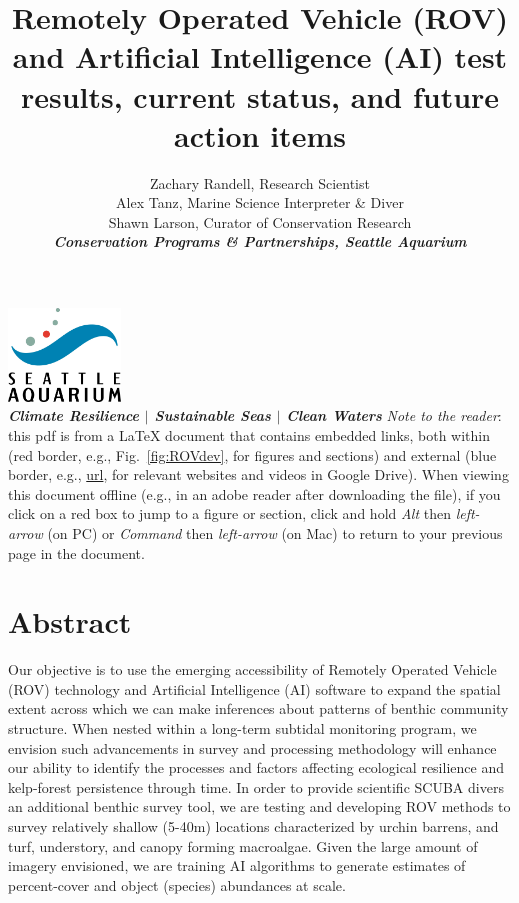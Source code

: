 \documentclass[11pt]{article}
\title{
Remotely Operated Vehicle (ROV) and Artificial Intelligence (AI) test 
results, current status, and future action items
}
\author{
Zachary Randell, Research Scientist
\\
Alex Tanz, Marine Science Interpreter \& Diver 
\\
Shawn Larson, Curator of Conservation Research
\\
\vspace{5pt}
\textit{\textbf{Conservation Programs \& Partnerships, Seattle 
Aquarium}}
}
\begin{document}
\begin{titlepage}
\maketitle
\tableofcontents
\vfill
\centering
\includegraphics[width=3cm]{logo.jpg}
\\
\textit{\textbf{
Climate Resilience $\vert$ 
Sustainable Seas $\vert$ 
Clean Waters
}} 
\vfill
\justifying
\noindent\textit{Note to the reader}: this pdf is from a LaTeX 
document that contains embedded links, both 
within (red border, e.g., Fig.~\ref{fig:ROVdev}, for figures and 
sections) and 
external (blue border, e.g.,  
\href{https://www.latex-project.org/about/}{url}, 
for relevant websites and videos in Google Drive). 
When viewing this document offline (e.g., in an adobe reader after 
downloading the file), if you click on a red box to jump to a figure or 
section, click and hold \textit{Alt} then \textit{left-arrow} (on PC) 
or \textit{Command} then \textit{left-arrow} (on Mac) to return to your 
previous page in the document.
\end{titlepage}





\section{Abstract}
\label{Abstract}
Our objective is to use the emerging accessibility of Remotely Operated 
Vehicle (ROV) technology and Artificial Intelligence (AI) software to 
expand the spatial extent across which we can make inferences about 
patterns of benthic community structure. 
When nested within a long-term subtidal monitoring program, we envision 
such advancements in survey and processing methodology will enhance our 
ability to identify the processes and factors affecting ecological 
resilience and kelp-forest persistence through time.
In order to provide scientific SCUBA divers an additional benthic 
survey tool, we are testing and developing ROV methods to survey 
relatively shallow (5-40m) locations characterized by urchin barrens, 
and turf, understory, and canopy forming macroalgae. 
Given the large amount of imagery envisioned, we are training 
AI algorithms to generate estimates of percent-cover and object 
(species) abundances at scale.
  
\end{document}
